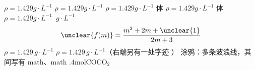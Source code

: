 $\rho=1.429\unit{g\cdot L^{-1}}$
$\rho=1.429\unit{g\cdot L^{-1}}$
$\rho=1.429\unit{g\cdot L^{-1}}$
体 $\rho=1.429\unit{g\cdot L^{-1}}$
体 $\rho=1.429\unit{g\cdot L^{-1}}$
\unclear{$\ldots$}\,$\unit{g\cdot L^{-1}}$
\[ \unclear{f(m)}=\dfrac{m^{2}+2m+\unclear{1}}{2m+3} \]
 $\rho=1.429\,\unit{g\cdot L^{-1}}$
 $\rho=1.429\,\unit{g\cdot L^{-1}}$\quad（右端另有一处字迹 ）
涂鸦：多条波浪线，其间写有 math、math
.4mol\quad $\mathrm{CO}$\quad $\mathrm{CO_2}$


